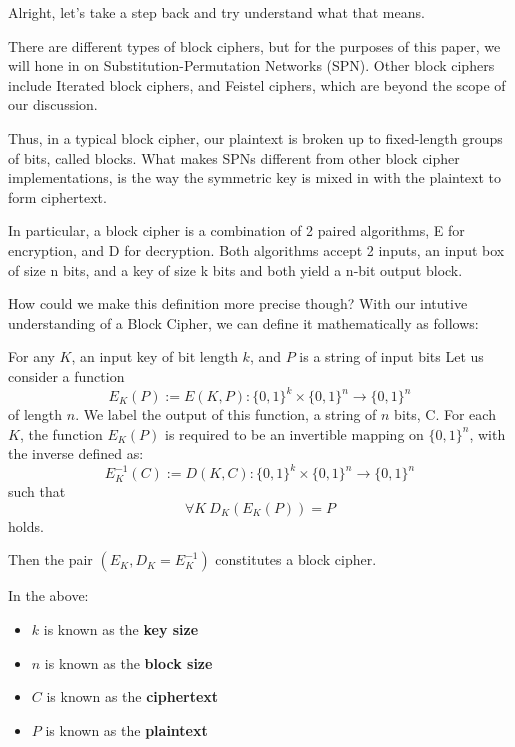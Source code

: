Alright, let's take a step back and try understand what that means. 

There are different types of block ciphers, but for the purposes of this paper,
we will hone in on Substitution-Permutation Networks (SPN). Other block ciphers
include Iterated block ciphers, and Feistel ciphers, which are beyond the scope
of our discussion.

Thus, in a typical block cipher, our plaintext is broken up to fixed-length
groups of bits, called blocks. What makes SPNs different from other block
cipher implementations, is the way the symmetric key is mixed in with the
plaintext to form ciphertext. 

In particular, a block cipher is a combination of 2 paired algorithms, E for
encryption, and D for decryption. Both algorithms accept 2 inputs, an input box
of size n bits, and a key of size k bits and both yield a n-bit output block. 

How could we make this definition more precise though? With our intutive
understanding of a Block Cipher, we can define it mathematically as follows:


\begin{defn}
For any $K$, an input key of bit length $k$, and $P$ is a string of input bits
Let us consider a function 
\begin{equation}
E_K(P) := E(K,P): \{0,1\}^k \times \{0,1\}^n \rightarrow \{0,1\}^n
\end{equation}
of length $n$. We label the output of this function, a string of $n$ bits, C. 
For each $K$, the function $E_K(P)$ is required to be an invertible mapping
on $\{0,1\}^n$, with the inverse defined as:
\begin{equation}
E_K ^{-1}(C) := D(K,C): \{0,1\}^k \times \{0,1\}^n \rightarrow \{0,1\}^n
\end{equation}
such that
\begin{equation}
\forall K\ D_K(E_K(P)) = P
\end{equation}
holds.

Then the pair $(E_K, D_K = E_K ^{-1})$ constitutes a block cipher. 
\end{defn}

\begin{rem}
In the above:
\begin{itemize}
\item $k$ is known as the \textbf{key size}
\item $n$ is known as the \textbf{block size}
\item $C$ is known as the \textbf{ciphertext}
\item $P$ is known as the \textbf{plaintext}
 
\end{itemize}
\end{rem}




